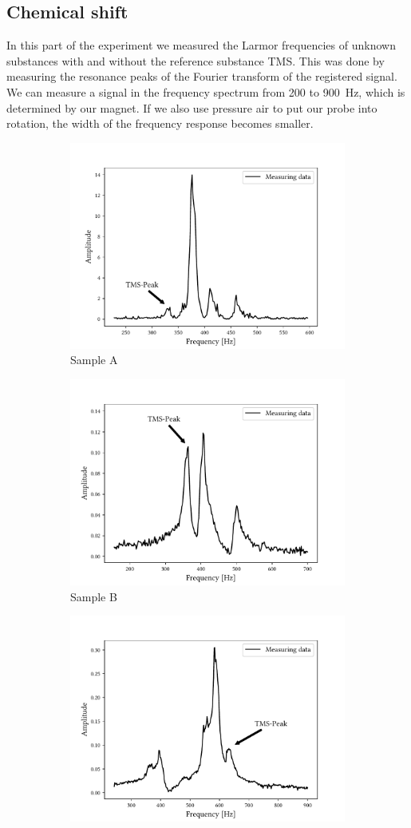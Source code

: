\subsection{Chemical shift}
In this part of the experiment we measured the Larmor frequencies of unknown substances with and without the reference substance TMS.
This was done by measuring the resonance peaks of the Fourier transform of the registered signal.
We can measure a signal in the frequency spectrum from \num{200} to \SI{900}{\hertz}, which is determined by our magnet.
If we also use pressure air to put our probe into rotation, the width of the frequency response becomes smaller.
\begin{figure}[ht]
\begin{subfigure}{.45\textwidth}
\includegraphics[width=9.3cm]{..//figures//f61_abb_4.pdf}
\caption{Sample A}
\end{subfigure}
\qquad
\begin{subfigure}{.495\textwidth}
\includegraphics[width=9.3cm]{..//figures//f61_abb_5.pdf}
\caption{Sample B}
\end{subfigure}
\qquad
\begin{subfigure}{.45\textwidth}
\includegraphics[width=9.3cm]{..//figures//f61_abb_6.pdf}

\end{subfigure}
\end{figure}
